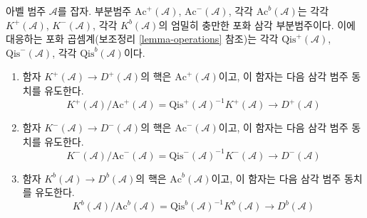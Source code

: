 \begin{lemma}
\label{lemma-bounded-derived}
아벨 범주 $\mathcal{A}$를 잡자. 부분범주
$\text{Ac}^{+}(\mathcal{A})$, $\text{Ac}^{-}(\mathcal{A})$, 각각
$\text{Ac}^b(\mathcal{A})$는 각각 $K^{+}(\mathcal{A})$, $K^{-}(\mathcal{A})$,
각각 $K^b(\mathcal{A})$의 엄밀히 충만한 포화 삼각 부분범주이다.
이에 대응하는 포화 곱셈계(보조정리 \ref{lemma-operations} 참조)는 각각
$\text{Qis}^{+}(\mathcal{A})$, $\text{Qis}^{-}(\mathcal{A})$,
각각 $\text{Qis}^b(\mathcal{A})$이다.
\begin{enumerate}
\item 함자 $K^{+}(\mathcal{A}) \to D^{+}(\mathcal{A})$의 핵은
$\text{Ac}^{+}(\mathcal{A})$이고, 이 함자는 다음 삼각 범주 동치를 유도한다.
$$
K^{+}(\mathcal{A})/\text{Ac}^{+}(\mathcal{A}) =
\text{Qis}^{+}(\mathcal{A})^{-1}K^{+}(\mathcal{A})
\longrightarrow D^{+}(\mathcal{A})
$$
\item 함자 $K^{-}(\mathcal{A}) \to D^{-}(\mathcal{A})$의 핵은
$\text{Ac}^{-}(\mathcal{A})$이고, 이 함자는 다음 삼각 범주 동치를 유도한다.
$$
K^{-}(\mathcal{A})/\text{Ac}^{-}(\mathcal{A}) =
\text{Qis}^{-}(\mathcal{A})^{-1}K^{-}(\mathcal{A})
\longrightarrow D^{-}(\mathcal{A})
$$
\item 함자 $K^b(\mathcal{A}) \to D^b(\mathcal{A})$의 핵은
$\text{Ac}^b(\mathcal{A})$이고, 이 함자는 다음 삼각 범주 동치를 유도한다.
$$
K^b(\mathcal{A})/\text{Ac}^b(\mathcal{A}) =
\text{Qis}^b(\mathcal{A})^{-1}K^b(\mathcal{A})
\longrightarrow D^b(\mathcal{A})
$$
\end{enumerate}
\end{lemma}

